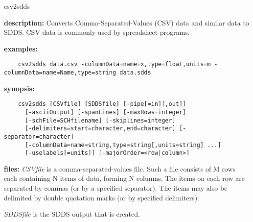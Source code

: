 \begin{sddsprog}{csv2sdds}
  \item \textbf{description:} Converts Comma-Separated-Values (CSV) data and similar data to SDDS. CSV data is commonly used by spreadsheet programs.
  \item \textbf{examples:}
    \begin{verbatim}
    csv2sdds data.csv -columnData=name=x,type=float,units=m -columnData=name=Name,type=string data.sdds
    \end{verbatim}
  \item \textbf{synopsis:}
    \begin{verbatim}
    csv2sdds [CSVfile] [SDDSfile] [-pipe[=in][,out]]
      [-asciiOutput] [-spanLines] [-maxRows=integer]
      [-schFile=SCHfilename] [-skiplines=integer]
      [-delimiters=start=character,end=character] [-separator=character]
      [-columnData=name=string,type=string[,units=string] ...]
      [-uselabels[=units]] [-majorOrder=<row|column>]
    \end{verbatim}
  \item \textbf{files:}
    {\em CSVfile} is a comma-separated-values file. Such a file consists of M rows each containing
    N items of data, forming N columns. The items on each row are separated by commas (or by a
    specified separator). The items may also be delimited by double quotation marks (or by specified
    delimiters).

    {\em SDDSfile} is the SDDS output that is created.


\end{sddsprog}
